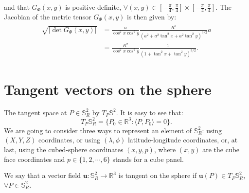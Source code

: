 and that $G_{\Phi}(x,y)$ is positive-definite, 
$\forall (x,y) \in [-\frac{\pi}{4},\frac{\pi}{4}] 
\times [-\frac{\pi}{4},\frac{\pi}{4}]$.
The Jacobian of the metric tensor $G_{\Phi}(x,y)$ is then given by:
\begin{align}
	\label{metrictensor-cs-equiangular}
	\begin{split}
		\sqrt{|\det{G_{\Phi}(x,y)}|} &= \frac{a}{\cos^2 x \cos^2 y}
		\frac{R^2}{(a^2 + a^2\tan^2x + a^2\tan^2y)^{3/2}}a\\
		&= \frac{R^2}{\cos^2 x \cos^2 y}
		\frac{1}{(1 + \tan^2x + \tan^2y)^{3/2}}.
	\end{split}
\end{align}

\section{Tangent vectors on the sphere}
\label{cs-tgvectors}
The tangent space at $P \in \mathbb{S}^2_R$ by $T_P \mathbb{S}^2$.
It is easy to see that:
\begin{equation*}
	T_P\mathbb{S}^2_R = \{P_0 \in \mathbb{R}^3: \langle P,P_0\rangle = 0\}.
\end{equation*}
We are going to consider three ways to represent an element of $\mathbb{S}_R^2$:
using $(X,Y,Z)$ coordinates, or using $(\lambda, \phi)$
latitude-longitude coordinates, or, at last, using the cubed-sphere
coordinates $(x,y,p)$, where $(x,y)$ are the cube face coordinates and 
$p \in \{1,2,\cdots, 6\}$ stands for a cube panel.

We say that a vector field $\boldsymbol{u}: \mathbb{S}^2_R \to 
\mathbb{R}^3$ is tangent on  the sphere if
$\boldsymbol{u}(P) \in T_P\mathbb{S}^2_R$, $\forall P \in \mathbb{S}^2_R$.

